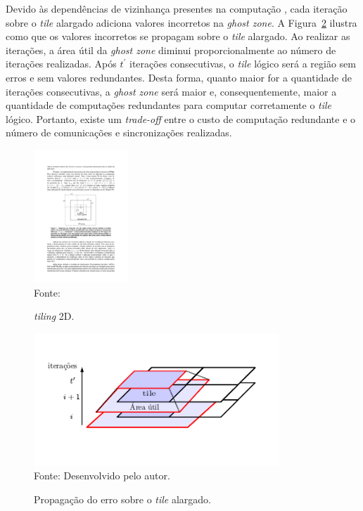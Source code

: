 Devido às dependências de vizinhança presentes na computação \stencil, cada
iteração sobre o \textit{tile} alargado adiciona valores incorretos na
\textit{ghost zone}. A Figura~\ref{fig:errorPropagation} ilustra como que os
valores incorretos se propagam sobre o \textit{tile} alargado. Ao realizar as
iterações, a área útil da \textit{ghost zone} diminui proporcionalmente ao
número de iterações realizadas. Após $t^\prime$ iterações consecutivas, o
\textit{tile} lógico será a região sem erros e sem valores redundantes. Desta
forma, quanto maior for a quantidade de iterações consecutivas, a \textit{ghost
    zone} será maior e, consequentemente, maior a quantidade de computações
redundantes para computar corretamente o \textit{tile} lógico. Portanto, existe
um \textit{trade-off} entre o custo de computação redundante e o número de
comunicações e sincronizações realizadas.

\begin{figure}[!h]
  \begin{minipage}[b]{0.9\textwidth}
	\centering
    \caption{\textit{tiling} 2D.}
    \includegraphics[height=5cm]{figs/tile.pdf} \\
    Fonte:~\cite{rocha17}
	\label{fig:block2d}
  \end{minipage}
\end{figure}

\begin{figure}[!h]
  \begin{minipage}[b]{0.9\textwidth}
	\centering
    \caption{Propagação do erro sobre o \textit{tile} alargado.}
    \includegraphics[height=5cm]{figs/tilingProp.pdf} \\
    Fonte: Desenvolvido pelo autor.
    \label{fig:errorPropagation}
  \end{minipage}
\end{figure}

